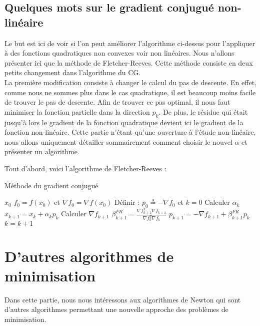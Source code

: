 \subsection{Quelques mots sur le gradient conjugué non-linéaire}
Le but est ici de voir si l'on peut améliorer l'algorithme ci-dessus pour l'appliquer à des fonctions quadratiques non convexes voir non linéaires. Nous n'allons présenter ici que la méthode de Fletcher-Reeves. Cette méthode consiste en deux petits changement dans l'algorithme du CG. \\

La première modification consiste à changer le calcul du pas de descente. En effet, comme nous ne sommes plus dans le cas quadratique, il est beaucoup moins facile de trouver le pas de descente. Afin de trouver ce pas optimal, il nous faut minimiser la fonction partielle dans la direction $p_k$. De plus, le résidue qui était jusqu'à lors le gradient de la fonction quadratique devient ici le gradient de la fonction non-linéaire. Cette partie n'étant qu'une ouverture à l'étude non-linéaire, nous allons uniquement détailler sommairement comment choisir le nouvel $\alpha$ et présenter un algorithme. 

Tout d'abord, voici l'algorithme de Fletcher-Reeves : 

\begin{algorithm}[H]
	\caption{Méthode du gradient conjugué}
	\begin{algorithmic}[1]
		\Require $x_0$
		\State $f_0 = f(x_0)$ et $\nabla f_0 = \nabla f(x_0)$
		\State Définir : $p_0 \triangleq -\nabla f_0$ et $k  =0$
		\State Calculer $\alpha_k$
		\State $x_{k+1} = x_k + \alpha_k p_k$
		\State Calculer $\nabla f_{k+1}$
		\State 	$\beta^{FR}_{k+1} = \frac{\nabla f_{k+1}^T\nabla f_{k+1}}{\nabla f_k^T\nabla f_k}$
		\State $p_{k+1} = -\nabla f_{k+1}+\beta^{FR}_{k+1} p_k$
		\State $k = k+1$
		\EndWhile

	\end{algorithmic}
\end{algorithm}


\section{D'autres algorithmes de minimisation}
Dans cette partie, nous nous intéressons aux algorithmes de Newton qui sont d'autres algorithmes permettant une nouvelle approche des problèmes de minimisation.
